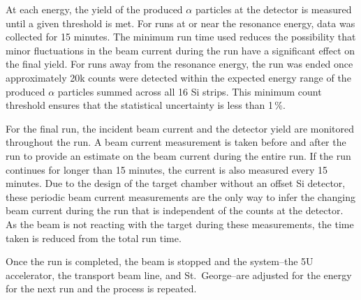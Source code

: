 At each energy, the yield of the produced $\alpha$ particles at the
detector is measured until a given threshold is met. For runs at or near
the resonance energy, data was collected for 15 minutes. The minimum run
time used reduces the possibility that minor fluctuations in the beam
current during the run have a significant effect on the final yield. For
runs away from the resonance energy, the run was ended once
approximately 20k counts were detected within the expected energy range
of the produced $\alpha$ particles summed across all 16 Si strips. This
minimum count threshold ensures that the statistical uncertainty is less
than 1\,\%.

For the final run, the incident beam current and the detector yield are
monitored throughout the run. A beam current measurement is taken before
and after the run to provide an estimate on the beam current during the
entire run. If the run continues for longer than 15 minutes, the current
is also measured every 15 minutes. Due to the design of the target
chamber without an offset Si detector, these periodic beam current
measurements are the only way to infer the changing beam current during
the run that is independent of the counts at the detector. As the beam
is not reacting with the target during these measurements, the time
taken is reduced from the total run time.

Once the run is completed, the beam is stopped and the system\---{}the
5U accelerator, the transport beam line, and St.\ George\---{}are
adjusted for the energy for the next run and the process is repeated.

